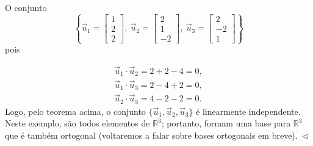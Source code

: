 \documentclass[../livro.tex]{subfiles}  %
\begin{document}
\begin{example}
O conjunto 
\begin{equation}
\left\lbrace 
\vec{u}_1 = \begin{bmatrix}
1 \\ 2 \\ 2
\end{bmatrix}, \ 
\vec{u}_2 = \begin{bmatrix}
2 \\ 1 \\ -2
\end{bmatrix}, \ 
\vec{u}_3 = \begin{bmatrix}
2 \\ -2 \\ 1
\end{bmatrix}
\right\rbrace 
\end{equation} pois

\begin{equation}
\begin{split}
\vec{u}_1 \cdot \vec{u}_2 = 2 + 2 - 4 = 0, \\
\vec{u}_1 \cdot \vec{u}_3 = 2 - 4 + 2 = 0, \\
\vec{u}_2 \cdot \vec{u}_3 = 4 - 2 - 2 = 0. 
\end{split} 
\end{equation}
Logo, pelo teorema acima, o conjunto $\{\vec{u}_1, \vec{u}_2,\vec{u}_3\}$ é linearmente independente. Neste exemplo, são todos elementos de $\mathbb{R}^3$; portanto, formam uma base para $\mathbb{R}^3$ que é também ortogonal (voltaremos a falar sobre bases ortogonais em breve)$. \ \lhd$
\end{example}
\end{document}
